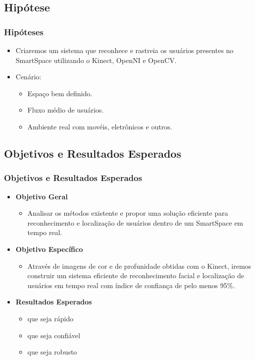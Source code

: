 \documentclass{beamer}
\begin{document}
\subsection{Hipótese}
\begin{frame}
    \frametitle{Hipóteses}
    \begin{itemize}
      \item Criaremos um sistema que reconhece e rastreia os usuários presentes no SmartSpace utilizando o Kinect, OpenNI e OpenCV.

      \item Cenário:
        \begin{itemize}
            \item Espaço bem definido.
            \item Fluxo médio de usuários.
            \item Ambiente real com movéis, eletrônicos e outros.
        \end{itemize} 
    \end{itemize}
\end{frame}


\subsection{Objetivos e Resultados Esperados}
\begin{frame}
    \frametitle{Objetivos e Resultados Esperados}
    \begin{itemize}
      \item \textbf{Objetivo Geral}
        \begin{itemize}
          \item Analisar os métodos existente e propor uma solução eficiente para reconhecimento e localização de usuários dentro de um SmartSpace em tempo real.
        \end{itemize}
      \item \textbf{Objetivo Específico}
        \begin{itemize}
            \item Através de imagens de cor e de profunidade obtidas com o Kinect, iremos construir um sistema eficiente de reconhecimento facial e localização de usuários em tempo real com índice de confiança de pelo menos 95\%.
        \end{itemize}
      \item \textbf{Resultados Esperados}
        \begin{itemize}
          \item que seja rápido
          \item que seja confiável
          \item que seja robusto
        \end{itemize}
    \end{itemize}
\end{frame}
\end{document}
